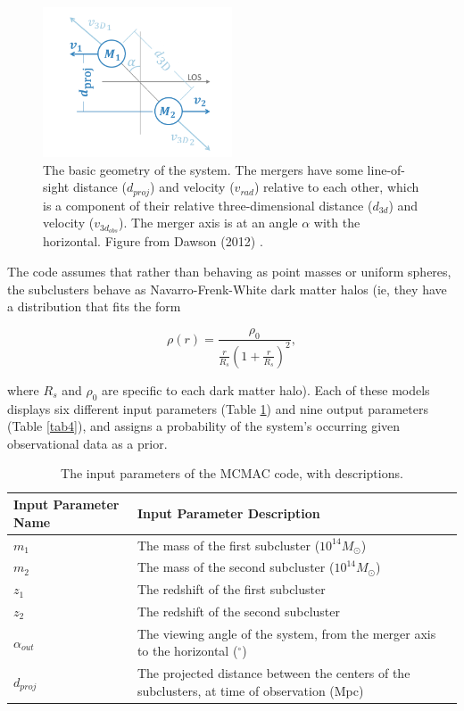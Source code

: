 \documentclass[12 pt]{article}
\renewcommand{\baselinestretch}{2}
\begin{document}
\renewcommand{\baselinestretch}{1}
\begin{figure}[h]
\caption{The basic geometry of the system. The mergers have some line-of-sight distance ($d_{proj}$) and velocity ($v_{rad}$) relative to each other, which is a component of their relative three-dimensional distance ($d_{3d}$) and velocity ($v_{3d_{obs}}$). The merger axis is at an angle $\alpha$ with the horizontal. Figure from Dawson (2012) \cite{Dawson13}.}
\label{willfig}
\centering
\includegraphics[width=0.5\textwidth]{willfig}
\end{figure}
\renewcommand{\baselinestretch}{2}

The code assumes that rather than behaving as point masses or uniform spheres, the subclusters behave as Navarro-Frenk-White dark matter halos (ie, they have a distribution that fits the form 

\renewcommand{\baselinestretch}{1}
\begin{equation}
\label{nfw}
\rho(r) = \frac{{\rho}_0}{\frac{r}{R_s} (1+\frac{r}{R_s})^2},
\end{equation}
\renewcommand{\baselinestretch}{2}

where $R_s$ and ${\rho}_0$ are specific to each dark matter halo). Each of these models displays six different input parameters (Table \ref{tab3}) and nine output parameters (Table \ref{tab4}), and assigns a probability of the system's occurring given observational data as a prior. 

\renewcommand{\baselinestretch}{1}
\begin{table}
\begin{tabular}{|p{1.75in}|p{4in}|} \hline
\textbf{Input Parameter Name} & \textbf{Input Parameter Description} \\ \hline
$m_1$ & The mass of the first subcluster ($10^{14} M_{\odot}$) \\ \hline
$m_2$ & The mass of the second subcluster ($10^{14} M_{\odot}$) \\ \hline
$z_1$ & The redshift of the first subcluster \\ \hline
$z_2$ & The redshift of the second subcluster \\ \hline
$\alpha_{out}$ & The viewing angle of the system, from the merger axis to the horizontal ($^{\circ}$) \\ \hline
$d_{proj}$ & The projected distance between the centers of the subclusters, at time of observation (Mpc) \\ \hline
\end{tabular}
\caption{The input parameters of the MCMAC code, with descriptions.}
\label{tab3}
\end{table}
\renewcommand{\baselinestretch}{2}
\end{document}
